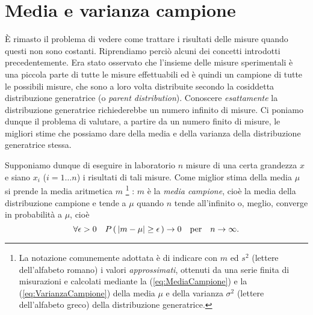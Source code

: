 \section{Media e varianza campione}
\label{sec:MediaVarCampione}

\`E rimasto il problema di vedere come trattare i risultati delle misure
quando questi non sono costanti. Riprendiamo perci\`o alcuni dei concetti
introdotti precedentemente. Era stato osservato che l'insieme delle misure
sperimentali \`e una piccola parte di tutte le misure effettuabili ed
\`e quindi un campione di tutte le possibili misure, che sono a loro
volta  distribuite secondo la cosiddetta distribuzione generatrice
(o {\itshape parent distribution}).
Conoscere {\itshape esattamente} la distribuzione generatrice richiederebbe
un numero infinito di misure.
Ci poniamo dunque il problema di valutare, a partire da un numero finito
di misure, le migliori stime che possiamo dare della media e della varianza
della distribuzione generatrice stessa.

Supponiamo dunque di eseguire in laboratorio $n$ misure di una certa
grandezza $x$ e siano $x_i$ ($i=1 \ldots n$) i risultati di tali misure.
Come miglior stima della media $\mu$ si prende la
media aritmetica $m$%
\renewcommand{\thefootnote}{\fnsymbol{footnote}}
\footnote{
La notazione comunemente adottata
\`e di indicare con $m$ ed $s^2$ (lettere dell'alfabeto romano) i valori
{\itshape approssimati}, ottenuti da una serie finita di misurazioni e
calcolati mediante la (\ref{eq:MediaCampione}) e la
(\ref{eq:VarianzaCampione}) della media $\mu$ e della varianza $\sigma^2$
(lettere dell'alfabeto greco) della distribuzione generatrice.
}%
\renewcommand{\thefootnote}{\arabic{footnote}}
:
$m$ \`e la {\itshape media campione}, cio\`e la media della distribuzione
campione e tende a $\mu$ quando $n$ tende all'infinito o, meglio, converge in
probabilit\`a a $\mu$, cio\`e
$$
\forall\epsilon>0\quad \displaystyle P\left(\, |m-\mu| \ge \epsilon \, \right)\to 0\quad
{\rm per}\quad n\to\infty.
$$

